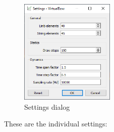 \documentclass[12pt]{article}
\begin{document}
\begin{figure}[H]
\centering
\includegraphics[width=0.4\textwidth]{figures/screenshots/input/settings}
\caption{Settings dialog}
\label{fig:settings}
\end{figure}

\newpage
These are the individual settings:
\end{document}
